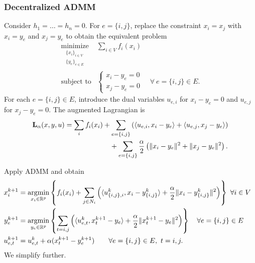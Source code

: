 \documentclass[10pt,mathserif]{beamer}
\begin{document}
\begin{frame}
\frametitle{Decentralized ADMM}
Consider $h_1=\dots=h_n=0$.
For $e=\{i,j\}$,
replace the constraint $x_i=x_j$ 
with  $x_i=y_e$ and $x_j=y_e$ to obtain the equivalent problem
\[
\begin{array}{ll}
\underset{\substack{\{x_i\}_{i\in V}\\\{y_e\}_{e\in E}}}{\mbox{minimize}} &\displaystyle{\sum_{i\in V} f_i(x_i)}\\
\mbox{subject to}&
  \begin{cases}
  x_i-y_e=0\\
  x_j-y_e=0
  \end{cases} \quad \forall~e=\{i,j\}\in E.
\end{array}
\]
For each $e=\{i,j\}\in E$, introduce the dual variables  $u_{e,i}$ for $x_i-y_e=0$ and $u_{e,j}$ for $x_j-y_e=0$. The augmented Lagrangian is
\begin{align*}
\mathbf{L}_\alpha (x,y,u)=\sum_{i}f_i(x_i)&+\sum_{e=\{i,j\}}\left(\langle u_{e,i} , x_i-y_e\rangle+\langle u_{e,j} , x_j-y_e\rangle\right)\\
&\quad +\sum_{e=\{i,j\}}\frac{\alpha}{2}\left(\|x_i-y_e\|^2+\|x_j-y_e\|^2\right).
\end{align*}
\end{frame}


\begin{frame}[fragile]
Apply ADMM and obtain
\begingroup\makeatletter\def\f@size{9}\check@mathfonts
\begin{align*}
 \!\!\!\!\! x_i^{k+1} & = \argmin_{x_i\in \reals^p}\left\{ f_i(x_i) + \sum_{j\in N_i}\left(\langle u_{\{i,j\},i}^k,x_i-y_{\{i,j\}}^k\rangle+\frac{\alpha}{2}\|x_i-y_{\{i,j\}}^k\|^2\right)\right\}\,\,\forall i\in V\\
  \!\!\!\!\!y_e^{k+1} & = \argmin_{y_e\in \reals^p}\left\{\sum_{t=i,j} \left(\langle u_{e,t}^k, x_t^{k+1}-y_e\rangle+\frac{\alpha}{2}\|x_t^{k+1}-y_e\|^2\right)\right\}\quad\forall e=\{i,j\}\in E\\
  \!\!\!\!\!u_{e,t}^{k+1} & = u_{e,t}^k + \alpha(x_t^{k+1}-y_e^{k+1}) \qquad \forall e=\{i,j\}\in E,~t=i,j.
\end{align*}
\endgroup
We simplify further.
\end{frame}
\end{document}
